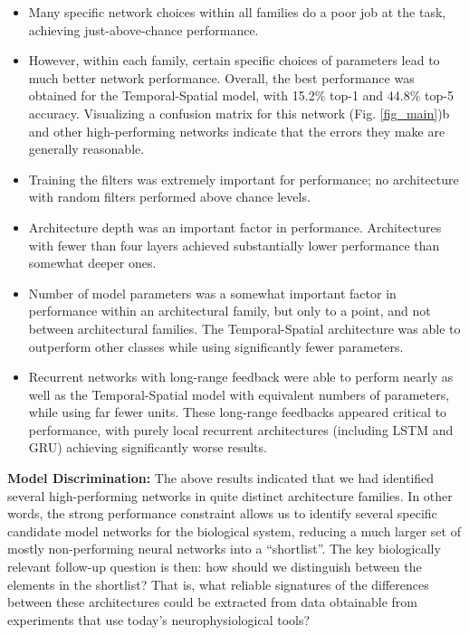 \begin{itemize}[leftmargin=*,itemsep=0ex,topsep=1ex]
   \item Many specific network choices within all families do a poor job at the task, achieving just-above-chance performance.
   \item However, within each family, certain specific choices of parameters lead to much better network performance.
   Overall, the best performance was obtained for the Temporal-Spatial model, with 15.2\% top-1 and 44.8\% top-5 accuracy.
   Visualizing a confusion matrix for this network (Fig. \ref{fig_main})b  and other high-performing networks indicate that the errors they make are generally reasonable.
   \item Training the filters was extremely important for performance; no architecture with random filters performed above chance levels.
   \item Architecture depth was an important factor in performance. Architectures with fewer than four layers achieved substantially lower performance than somewhat deeper ones.
   \item Number of model parameters was a somewhat important factor in performance within an architectural family, but only to a point, and not between architectural families.
   The Temporal-Spatial architecture was able to outperform other classes while using significantly fewer parameters.
   \item Recurrent networks with long-range feedback were able to perform nearly as well as the Temporal-Spatial model with equivalent numbers of parameters, while using far fewer units.
   These long-range feedbacks appeared critical to performance, with purely local recurrent architectures (including LSTM and GRU) achieving significantly worse results.
\end{itemize}

\textbf{Model Discrimination:}  The above results indicated that we had identified several high-performing networks in quite distinct architecture families.
In other words, the strong performance constraint allows us to identify several specific candidate model networks for the biological system, reducing a much larger set of mostly non-performing neural networks into a ``shortlist''.
The key biologically relevant follow-up question is then: how should we distinguish between the elements in the shortlist? 
That is, what reliable signatures of the differences between these architectures could be extracted from data obtainable from experiments that use today's neurophysiological tools?

